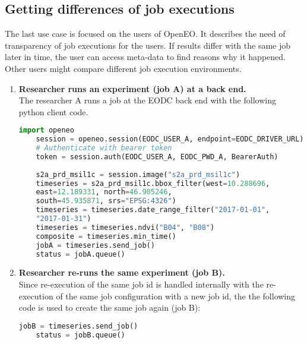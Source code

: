 \documentclass[draft,final]{vutinfth} %
\begin{document}
\subsection{Getting differences of job executions}\label{Implementation:Use Case3}
The last use case is focused on the users of OpenEO. It describes the need of transparency of job executions for the users. If results differ with the same job later in time, the user can access meta-data to find reasons why it happened. Other users might compare different job execution environments.  
\begin{enumerate}
	\item \textbf{Researcher runs an experiment (job A) at a back end.}\\
	The researcher A runs a job at the EODC back end with the following python client code. 
	\begin{lstlisting}[frame=single, language=Python]
	import openeo
	session = openeo.session(EODC_USER_A, endpoint=EODC_DRIVER_URL)
	# Authenticate with bearer token
	token = session.auth(EODC_USER_A, EODC_PWD_A, BearerAuth)
	
	s2a_prd_msil1c = session.image("s2a_prd_msil1c")
	timeseries = s2a_prd_msil1c.bbox_filter(west=10.288696, 
	east=12.189331, north=46.905246,
	south=45.935871, srs="EPSG:4326")
	timeseries = timeseries.date_range_filter("2017-01-01", 
	"2017-01-31")
	timeseries = timeseries.ndvi("B04", "B08")
	composite = timeseries.min_time()
	jobA = timeseries.send_job()
	status = jobA.queue()
	\end{lstlisting}
	\item \textbf{Researcher re-runs the same experiment (job B).}\\
	Since re-execution of the same job id is handled internally with the re-execution of the same job configuration with a new job id, the the following code is used to create the same job again (job B):
	\begin{lstlisting}[frame=single, language=Python]
	jobB = timeseries.send_job()
	status = jobB.queue()
	\end{lstlisting}
	

\end{enumerate}
\end{document}
